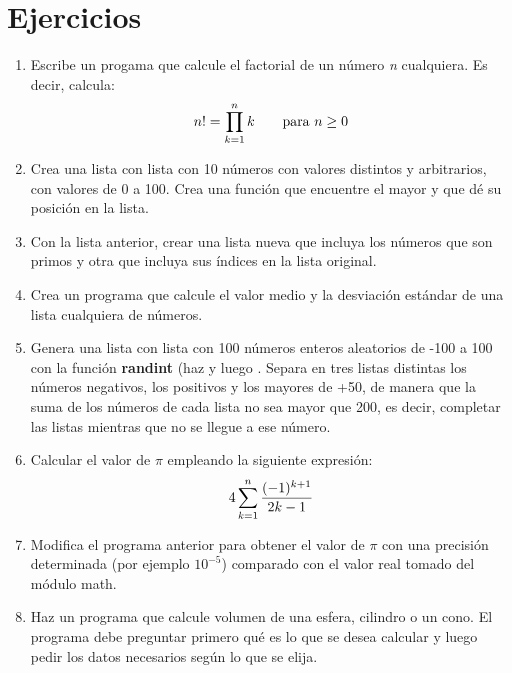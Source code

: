 \documentclass[letterpaper,10pt,spanish]{sphinxmanual}
\begin{document}
\section{Ejercicios}
\label{control_de_flujo:ejercicios}\begin{enumerate}
\item {} 
Escribe un progama que calcule el factorial de un número \emph{n} cualquiera. Es decir, calcula:
\begin{gather}
\begin{split}n!=\prod_{k=1}^n k\qquad\mbox{para }n\ge0\end{split}\notag
\end{gather}
\item {} 
Crea una lista con lista con 10 números con valores distintos y arbitrarios, con valores de 0 a 100. Crea una función que encuentre el mayor y que dé su posición en la lista.

\item {} 
Con la lista anterior, crear una lista nueva que incluya los números que son primos y otra que incluya sus índices en la lista original.

\item {} 
Crea un programa que calcule el valor medio y la desviación estándar de una lista cualquiera de números.

\item {} 
Genera una lista con lista con 100 números enteros aleatorios de -100 a 100 con la función \textbf{randint} (haz  y luego . Separa en tres listas distintas los números negativos, los positivos y los mayores de +50, de manera que la suma de los números de cada lista no sea mayor que 200, es decir, completar las listas mientras que no se llegue a ese número.

\item {} 
Calcular el valor de $\pi$ empleando la siguiente expresión:
\begin{gather}
\begin{split}4 \sum^n_{k=1} \frac{(-1)^{k+1}}{2k - 1}\end{split}\notag
\end{gather}
\item {} 
Modifica el programa anterior para obtener el valor de $\pi$ con una precisión determinada (por ejemplo $10^{-5}$) comparado con el valor real tomado del módulo math.

\item {} 
Haz un programa que calcule volumen de una esfera, cilindro o un cono. El programa debe preguntar primero qué es lo que se desea calcular y luego pedir los datos necesarios según lo que se elija.


\end{enumerate}
\end{document}
